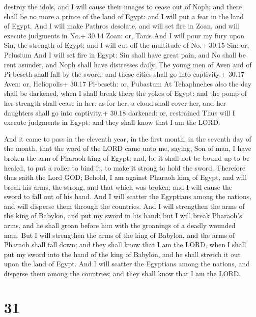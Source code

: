 destroy the idols, and I will cause their images to cease out of Noph;
and there shall be no more a prince of the land of Egypt: and I will put
a fear in the land of Egypt.  And I will make Pathros
desolate, and will set fire in Zoan, and will execute judgments in No.+
30.14 Zoan: or, Tanis  And I will pour my fury upon Sin,
the strength of Egypt; and I will cut off the multitude of No.+ 30.15
Sin: or, Pelusium  And I will set fire in Egypt: Sin shall
have great pain, and No shall be rent asunder, and Noph shall have
distresses daily.  The young men of Aven and of Pi-beseth
shall fall by the sword: and these cities shall go into captivity.+
30.17 Aven: or, Heliopolis+ 30.17 Pi-beseth: or, Pubastum 
At Tehaphnehes also the day shall be darkened, when I shall break there
the yokes of Egypt: and the pomp of her strength shall cease in her: as
for her, a cloud shall cover her, and her daughters shall go into
captivity.+ 30.18 darkened: or, restrained  Thus will I
execute judgments in Egypt: and they shall know that I am the LORD.

 And it came to pass in the eleventh year, in the first
month, in the seventh day of the month, that the word of the LORD came
unto me, saying,  Son of man, I have broken the arm of
Pharaoh king of Egypt; and, lo, it shall not be bound up to be healed,
to put a roller to bind it, to make it strong to hold the sword.
 Therefore thus saith the Lord GOD; Behold, I am against
Pharaoh king of Egypt, and will break his arms, the strong, and that
which was broken; and I will cause the sword to fall out of his hand.
 And I will scatter the Egyptians among the nations, and
will disperse them through the countries.  And I will
strengthen the arms of the king of Babylon, and put my sword in his
hand: but I will break Pharaoh's arms, and he shall groan before him
with the groanings of a deadly wounded man.  But I will
strengthen the arms of the king of Babylon, and the arms of Pharaoh
shall fall down; and they shall know that I am the LORD, when I shall
put my sword into the hand of the king of Babylon, and he shall stretch
it out upon the land of Egypt.  And I will scatter the
Egyptians among the nations, and disperse them among the countries; and
they shall know that I am the LORD.

\hypertarget{section-30}{%
\section{31}\label{section-30}}

